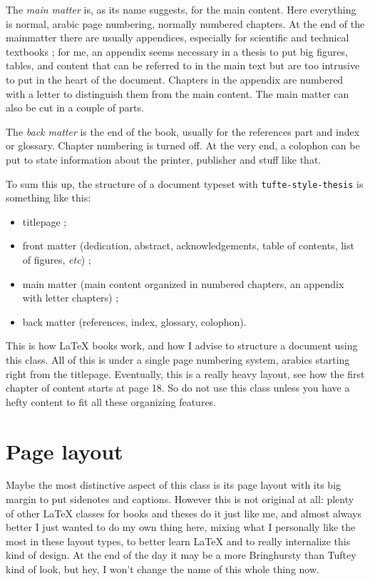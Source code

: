 \documentclass[
    11pt,
]{tufte-style-thesis}
\begin{document}
The \textit{main matter} is, as its name suggests, for the main content. Here everything is normal, arabic page numbering, normally numbered chapters. At the end of the mainmatter there are usually appendices, especially for scientific and technical textbooks ; for me, an appendix seems necessary in a thesis to put big figures, tables, and content that can be referred to in the main text but are too intrusive to put in the heart of the document. Chapters in the appendix are numbered with a letter to distinguish them from the main content. The main matter can also be cut in a couple of parts.

The \textit{back matter} is the end of the book, usually for the references part and index or glossary. Chapter numbering is turned off. At the very end, a colophon can be put to state information about the printer, publisher and stuff like that.

To sum this up, the structure of a document typeset with \texttt{tufte-style-thesis} is something like this:
\begin{itemize}
  \item titlepage ;
  \item front matter (dedication, abstract, acknowledgements, table of contents, list of figures, \textit{etc}) ;
  \item main matter (main content organized in numbered chapters, an appendix with letter chapters) ;
  \item back matter (references, index, glossary, colophon).
\end{itemize}
This is how \LaTeX{} books work, and how I advise to structure a document using this class. All of this is under a single page numbering system, arabics starting right from the titlepage. Eventually, this is a really heavy layout, see how the first chapter of content starts at page 18. So do not use this class unless you have a hefty content to fit all these organizing features.


\section{Page layout}

Maybe the most distinctive aspect of this class is its page layout with its big margin to put sidenotes and captions. However this is not original at all: plenty of other \LaTeX{} classes for books and theses do it just like me, and almost always better I just wanted to do my own thing here, mixing what I personally like the most in these layout types, to better learn \LaTeX{} and to really internalize this kind of design. At the end of the day it may be a more Bringhursty than Tuftey kind of look, but hey, I won't change the name of this whole thing now.
\end{document}
